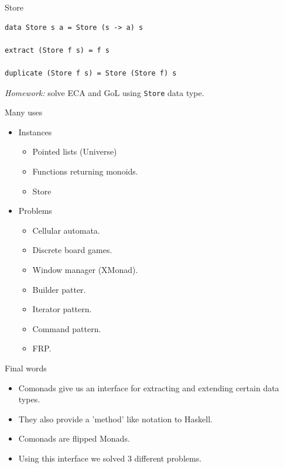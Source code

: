 \documentclass[presentation,aspectratio=169,smaller]{beamer}
\begin{document}
\begin{frame}[label={sec:org7920569},fragile]{Store}
 \begin{verbatim}
data Store s a = Store (s -> a) s

extract (Store f s) = f s

duplicate (Store f s) = Store (Store f) s
\end{verbatim}

\pause

\emph{Homework:} solve ECA and GoL using \texttt{Store} data type.
\end{frame}

\begin{frame}[label={sec:org53b3dd3}]{Many uses}
\begin{itemize}
\item <1-> Instances
\begin{itemize}
\item Pointed lists (Universe)
\item Functions returning monoids.
\item Store
\end{itemize}
\item <2-> Problems
\begin{itemize}
\item Cellular automata.
\item Discrete board games.
\item Window manager (XMonad).
\item Builder patter.
\item Iterator pattern.
\item Command pattern.
\item FRP.
\end{itemize}
\end{itemize}
\end{frame}

\begin{frame}[label={sec:org5829a9d}]{Final words}
\begin{itemize}
\item <1-> Comonads give us an interface for extracting and extending certain data
types.
\item <2-> They also provide a 'method' like notation to Haskell.
\item <3-> Comonads are flipped Monads.
\item <4-> Using this interface we solved 3 different problems.
\end{itemize}
\end{frame}
\end{document}
